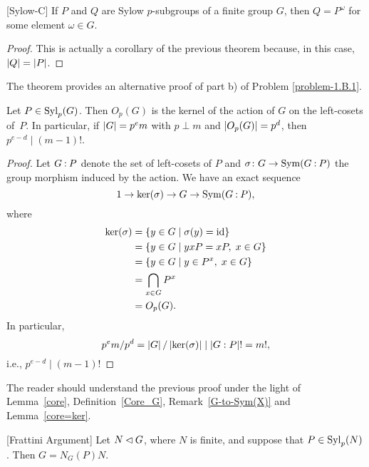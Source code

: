 \begin{thm}\label{sylow-c} {\rm[Sylow-C]}
    If\/ $P$ and\/ $Q$ are Sylow $p$-subgroups of a finite group $G$, then $Q = P^\omega$ for some element $\omega\in G$.
\end{thm}

\begin{proof} This is actually a corollary of the previous theorem because, in this case, $\left\vert{Q}\right\vert=\left\vert{P}\right\vert$.  \end{proof}

\begin{rem}
    The theorem provides an alternative proof of part\/ {\rm b)} of {\rm Problem \ref{problem-1.B.1}}.
\end{rem}


\begin{cor}
    Let $P\in{\rm Syl}_p(G)$. Then $O_p(G)$ is the kernel of the action of\/ $G$ on the left-cosets of\/~$P$. In particular, if $\left\vert{G}\right\vert=p^em$ with $p\perp m$ and $\left\vert{O_p(G)}\right\vert=p^d$, then $p^{e-d}\mid(m-1)!$.
\end{cor}

\begin{proof} Let $G\mathbin:P$ denote the set of left-cosets of $P$ and $\sigma\colon G\to{\rm Sym}(G\mathbin:P)$ the group morphism induced by the action. We have an exact sequence
$$
    1\to \ker(\sigma)\to G\to{\rm Sym}(G\mathbin:P),
$$
where
\begin{align*}
    \ker(\sigma) &= \{y\in G\mid \sigma(y)=\operatorname{id}\}\\
        &= \{y\in G\mid yxP=xP,\; x\in G\}\\
        &= \{y\in G\mid y\in P^x,\; x\in G\}\\
        &= \bigcap_{x\in G}P^x\\
        &=O_p(G).
\end{align*}
In particular,
$$
    p^em/p^d=\left\vert{G}\right\vert/\left\vert{\ker(\sigma)}\right\vert\mid\left\vert{G:P}\right\vert!=m!,
$$
i.e., $p^{e-d}\mid(m-1)!$  \end{proof}

\begin{rem}
    The reader should understand the previous proof under the light of\/ {\rm Lemma~\ref{core}}, {\rm Definition~\ref{Core_G}}, {\rm Remark~\ref{G-to-Sym(X)}} and\/ {\rm Lemma~\ref{core=ker}}.
\end{rem}

\begin{cor}\label{frattini-argument} {\rm[Frattini Argument]}
    Let $N\lhd G$, where $N$ is finite, and suppose that $P\in{\rm Syl}_p(N)$. Then $G=N_G(P)N$.
\end{cor}

